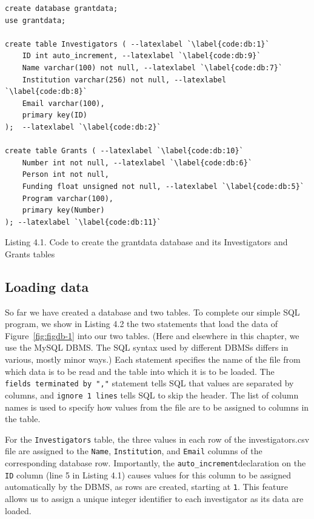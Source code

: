 \documentclass[]{krantz}
\begin{document}
\hypertarget{fig:db:create}{\label{fig:db:create}}
\begin{verbatim}
create database grantdata;
use grantdata;

create table Investigators ( --latexlabel `\label{code:db:1}`
    ID int auto_increment, --latexlabel `\label{code:db:9}`
    Name varchar(100) not null, --latexlabel `\label{code:db:7}`
    Institution varchar(256) not null, --latexlabel `\label{code:db:8}`
    Email varchar(100),
    primary key(ID)
);  --latexlabel `\label{code:db:2}`

create table Grants ( --latexlabel `\label{code:db:10}`
    Number int not null, --latexlabel `\label{code:db:6}`
    Person int not null,
    Funding float unsigned not null, --latexlabel `\label{code:db:5}`
    Program varchar(100),
    primary key(Number)
); --latexlabel `\label{code:db:11}`
\end{verbatim}

Listing 4.1. Code to create the grantdata database and its Investigators
and Grants tables

\subsection{Loading data}\label{loading-data}

So far we have created a database and two tables. To complete our simple
SQL program, we show in Listing 4.2 the two statements that load the
data of Figure~\ref{fig:figdb-1} into our two tables. (Here and
elsewhere in this chapter, we use the MySQL DBMS. The SQL syntax used by
different DBMSs differs in various, mostly minor ways.) Each statement
specifies the name of the file from which data is to be read and the
table into which it is to be loaded. The
\texttt{fields\ terminated\ by\ ","} statement tells SQL that values are
separated by columns, and \texttt{ignore\ 1\ lines} tells SQL to skip
the header. The list of column names is used to specify how values from
the file are to be assigned to columns in the table.

For the \texttt{Investigators} table, the three values in each row of
the investigators.csv file are assigned to the \texttt{Name},
\texttt{Institution}, and \texttt{Email} columns of the corresponding
database row. Importantly, the \texttt{auto\_increment}declaration on
the \texttt{ID} column (line 5 in Listing 4.1) causes values for this
column to be assigned automatically by the DBMS, as rows are created,
starting at \texttt{1}. This feature allows us to assign a unique
integer identifier to each investigator as its data are loaded.
\end{document}
